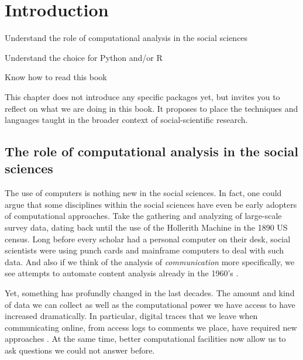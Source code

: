 \chapter{Introduction}
\label{chap:introduction}

\begin{abstract}{Abstract}
This chapter explains how the methods outlined in this book are
situated within the methodological and epistemological frameworks used
by social scientists. It argues why the use of Python and R is
fundamental for the computational analysis of communication. Finally,
it shows how this book can be used by students and scholars.
\end{abstract}


\begin{objectives}
\item Understand the role of computational analysis in the social sciences
\item Understand the choice for Python and/or R
\item Know how to read this book
\end{objectives}

\begin{feature}
This chapter does not introduce any specific packages yet, but invites
you to reflect on what we are doing in this book. It proposes to place
the techniques and languages taught in the broader context of
social-scientific research.
\end{feature}

\section{The role of computational analysis in the social sciences}
The use of computers is nothing new in the social sciences. In fact,
one could argue that some disciplines within the social sciences have
even be early adopters of computational approaches. Take the
gathering and analyzing of large-scale survey data, dating back until
the use of the Hollerith Machine in the 1890 US census. Long before
every scholar had a personal computer on their desk, social scientists
were using punch cards and mainframe computers to deal with such
data. And also if we think of the analysis of \emph{communication}
more specifically, we see attempts to automate content analysis
already in the 1960's \citep[see, e.g.][]{Scharkow2017}.

Yet, something has profundly changed in the last decades. The amount
and kind of data we can collect as well as the computational power we
have access to have increased dramatically. In particular, digital
traces that we leave when communicating online, from access logs to
comments we place, have required new approaches \citep[e.g.,][]{Trilling2017b}. At the same time, better computational
facilities now allow us to ask questions we could not answer before.


